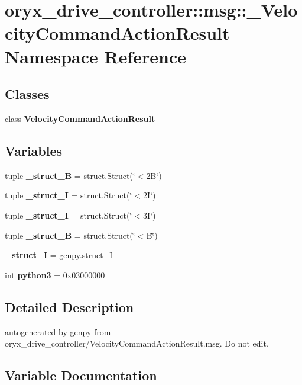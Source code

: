 \section{oryx\-\_\-drive\-\_\-controller\-:\-:msg\-:\-:\-\_\-\-Velocity\-Command\-Action\-Result \-Namespace \-Reference}
\label{namespaceoryx__drive__controller_1_1msg_1_1__VelocityCommandActionResult}
\subsection*{\-Classes}
\begin{DoxyCompactItemize}
\item 
class {\bf \-Velocity\-Command\-Action\-Result}
\end{DoxyCompactItemize}
\subsection*{\-Variables}
\begin{DoxyCompactItemize}
\item 
tuple {\bf \-\_\-struct\-\_\-B} = struct.\-Struct(\char`\"{}$<$2\-B\char`\"{})
\item 
tuple {\bf \-\_\-struct\-\_\-I} = struct.\-Struct(\char`\"{}$<$2\-I\char`\"{})
\item 
tuple {\bf \-\_\-struct\-\_\-I} = struct.\-Struct(\char`\"{}$<$3\-I\char`\"{})
\item 
tuple {\bf \-\_\-struct\-\_\-\-B} = struct.\-Struct(\char`\"{}$<$\-B\char`\"{})
\item 
{\bf \-\_\-struct\-\_\-\-I} = genpy.\-struct\-\_\-\-I
\item 
int {\bf python3} = 0x03000000
\end{DoxyCompactItemize}


\subsection{\-Detailed \-Description}
\begin{DoxyVerb}autogenerated by genpy from oryx_drive_controller/VelocityCommandActionResult.msg. Do not edit.\end{DoxyVerb}
 

\subsection{\-Variable \-Documentation}
